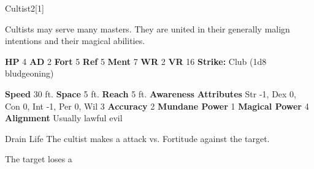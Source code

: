   \begin{monsection}{Cultist}{2}[1]
    \vspace{-1em}\vspace{-1em}
    \vspace{0em}

    
      Cultists may serve many masters.
      They are united in their generally malign intentions and their magical abilities.
    
    

    \begin{spellcontent}
      \begin{spelltargetinginfo}
        \pari \textbf{HP} 4 \monsep
          \textbf{AD} 2 \monsep
          \textbf{Fort} 5 \monsep
          \textbf{Ref} 5 \monsep
          \textbf{Ment} 7
        \pari \textbf{WR} 2 \monsep
        \textbf{VR} 16
        \pari \textbf{Strike:}
            Club  (1d8 bludgeoning)
      \end{spelltargetinginfo}
    \end{spellcontent}
    \begin{monsterfooter}
      \pari \textbf{Speed} 30 ft. \monsep
        \textbf{Space} 5 ft. \monsep
        \textbf{Reach} 5 ft.
      \pari \textbf{Awareness} 
      \pari \textbf{Attributes}
        Str -1, Dex 0,
        Con 0, Int -1,
        Per 0, Wil 3
      \pari \textbf{Accuracy} 2 \monsep
        \textbf{Mundane Power} 1 \monsep
      \textbf{Magical Power} 4
      \pari \textbf{Alignment} Usually lawful evil
    \end{monsterfooter}
  \end{monsection}
  \begin{freeability}{Drain Life}
       The cultist makes a  attack
        vs. Fortitude against the target.
    
    \hit The target loses a 
    \end{freeability}
  
